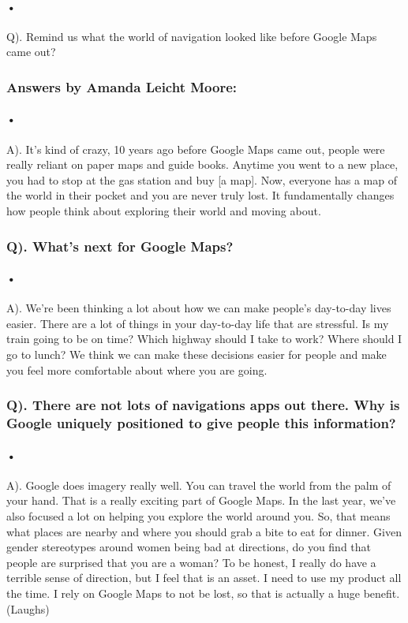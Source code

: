 \documentclass[7pt]{article}
\begin{document}
\paragraph{•}  
Q). Remind us what the world of navigation looked like before Google Maps came out?
\subsubsection*{Answers by Amanda Leicht Moore: }
\paragraph{•}  
 A). It’s kind of crazy, 10 years ago before Google Maps came out, people were really reliant on paper maps and guide books. Anytime you went to a new place, you had to stop at the gas station and buy [a map]. Now, everyone has a map of the world in their pocket and you are never truly lost. It fundamentally changes how people think about exploring their world and moving about.\cite{Caroline}
\subsubsection*{Q). What’s next for Google Maps?}
\paragraph{•} 
 A). We’re been thinking a lot about how we can make people’s day-to-day lives easier. There are a lot of things in your day-to-day life that are stressful. Is my train going to be on time? Which highway should I take to work? Where should I go to lunch? We think we can make these decisions easier for people and make you feel more comfortable about where you are going.\cite{Caroline}
\subsubsection*{Q). There are not lots of navigations apps out there. Why is Google uniquely positioned to give people this information?}
\paragraph{•}
A). Google does imagery really well. You can travel the world from the palm of your hand. That is a really exciting part of Google Maps. In the last year, we've also focused a lot on helping you explore the world around you. So, that means what places are nearby and where you should grab a bite to eat for dinner.
Given gender stereotypes around women being bad at directions, do you find that people are surprised that you are a woman?
To be honest, I really do have a terrible sense of direction, but I feel that is an asset. I need to use my product all the time. I rely on Google Maps to not be lost, so that is actually a huge benefit. (Laughs)\cite{Caroline} 
\end{document}
